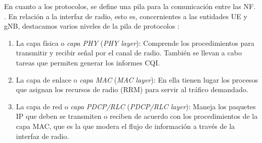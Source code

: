 \documentclass[12pt]{report} %
\begin{document}
En cuanto a los protocolos, se define una pila para la comunicación entre las NF.
\cite{RefWorks:47}.
En relación a la interfaz de radio, esto es, concernientes a las entidades UE y gNB, destacamos varios niveles de la pila de protocolos \cite{RefWorks:7}:
\begin{enumerate}
\item La capa física o \textit{capa PHY} (\textit{PHY layer}):
Comprende los procedimientos para transmitir y recibir señal por el canal de radio.
También se llevan a cabo tareas que permiten generar los informes CQI.
\item La capa de enlace o \textit{capa MAC} (\textit{MAC layer}):
En ella tienen lugar los procesos que asignan los recursos de radio (RRM) para servir al tráfico demandado.
\item La capa de red o \textit{capa PDCP/RLC} (\textit{PDCP/RLC layer}):
Maneja los paquetes IP que deben se transmiten o reciben de acuerdo con los procedimientos de la capa MAC,
que es la que modera el flujo de información a través de la interfaz de radio.
\end{enumerate}
\end{document}

